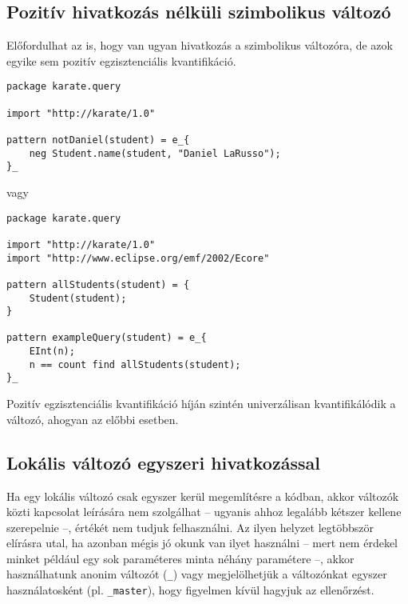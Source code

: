 \subsection{Pozitív hivatkozás nélküli szimbolikus változó}

Előfordulhat az is, hogy van ugyan hivatkozás a szimbolikus változóra, de azok egyike sem pozitív egzisztenciális kvantifikáció.

\begin{lstlisting}
package karate.query

import "http://karate/1.0"

pattern notDaniel(student) = e_{
    neg Student.name(student, "Daniel LaRusso");
}_
\end{lstlisting}
%
%
vagy
%
\begin{lstlisting}
package karate.query

import "http://karate/1.0"
import "http://www.eclipse.org/emf/2002/Ecore"

pattern allStudents(student) = {
    Student(student);
}

pattern exampleQuery(student) = e_{
    EInt(n);
    n == count find allStudents(student);
}_
\end{lstlisting}
%
%
Pozitív egzisztenciális kvantifikáció híján szintén univerzálisan kvantifikálódik a változó, ahogyan az előbbi esetben.

\subsection{Lokális változó egyszeri hivatkozással}

Ha egy lokális változó csak egyszer kerül megemlítésre a kódban, akkor változók közti kapcsolat leírására nem szolgálhat -- ugyanis ahhoz legalább kétszer kellene szerepelnie --, értékét nem tudjuk felhasználni. Az ilyen helyzet legtöbbször elírásra utal, ha azonban mégis jó okunk van ilyet használni -- mert nem érdekel minket például egy sok paraméteres minta néhány paramétere --, akkor használhatunk anonim változót (\texttt{\_}) vagy megjelölhetjük a változónkat egyszer használatosként (pl. \texttt{\_master}), hogy figyelmen kívül hagyjuk az ellenőrzést.

